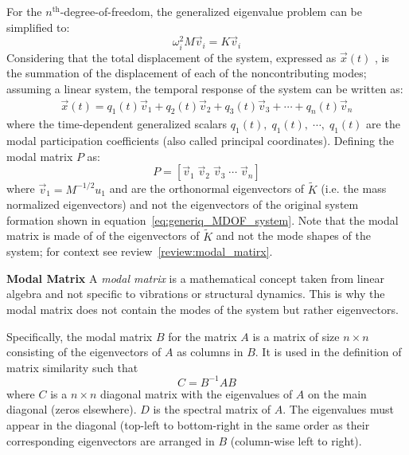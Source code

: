 \documentclass[12pt,letter]{article}
\begin{document}
	For the $n^{\text{th}}$-degree-of-freedom, the generalized eigenvalue problem can be simplified to: 
	\begin{equation}
	\omega_i^2 M \vec{v}_i = K  \vec{v}_i
	\end{equation}
	Considering that the total displacement of the system, expressed as $\vec{x}(t)$ , is the summation of the displacement of each of the noncontributing modes; assuming a linear system, the temporal response of the system can be written as:
	\begin{eqnarray}
	\vec{x}(t) = q_1(t) \vec{v}_1 + q_2(t) \vec{v}_2 + q_3(t) \vec{v}_3 + \cdots + q_n(t) \vec{v}_n
	\label{eq:combination_of_modes}
	\end{eqnarray}
	\noindent where the time-dependent generalized scalars $q_1(t), \; q_1(t), \; \cdots, \; q_1(t)$ are the modal participation coefficients (also called principal coordinates). Defining the modal matrix $P$ as: 
	\begin{equation}
	P = [ \vec{v}_1 \;  \vec{v}_2 \;  \vec{v}_3 \; \cdots \; \vec{v}_n]
	\end{equation}
	where $\vec{v}_1 = M^{-1/2}u_1$ and are the orthonormal eigenvectors of $\tilde{K}$ (i.e. the mass normalized eigenvectors) and not the eigenvectors of the original system formation shown in equation~\ref{eq:generiq_MDOF_system}. Note that the modal matrix is made of of the eigenvectors of $\tilde{K}$ and not the mode shapes of the system; for context see review~\ref{review:modal_matirx}.

		\begin{review}	
		\label{review:modal_matirx}
		\textbf{Modal Matrix} 
			A \emph{modal matrix} is a mathematical concept taken from linear algebra and not specific to vibrations or structural dynamics. This is why the modal matrix does not contain the modes of the system but rather eigenvectors. 
			
			Specifically, the modal matrix $B$ for the matrix $A$ is a matrix of size $n \times n$ consisting of the eigenvectors of $A$ as columns in $B$. It is used in the definition of matrix similarity such that 
			\begin{equation}
			C = B^{-1}AB
			\end{equation}
			where $C$ is a $n \times n$ diagonal matrix with the eigenvalues of $A$ on the main diagonal (zeros elsewhere). $D$ is the spectral matrix of $A$. The eigenvalues must appear in the diagonal (top-left to bottom-right in the same order as their corresponding eigenvectors are arranged in $B$ (column-wise left to right).			
		\end{review}	
	
\end{document}
